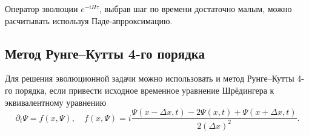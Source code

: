 \documentclass[10pt]{article}
\begin{document}
Оператор эволюции $e^{-i H \tau}$, выбрав шаг по времени достаточно малым, можно расчитывать используя Паде-апрроксимацию.

\subsection*{Метод Рунге--Кутты 4-го порядка}
Для решения эволюционной задачи можно использовать и метод Рунге--Кутты 4-го порядка, если привести исходное временное уравнение Шрёдингера к эквивалентному уравнению
\begin{equation}
 \partial_t \Psi = f(x, \Psi),\quad
 f(x, \Psi) = i\dfrac{\Psi(x-\Delta x, t) - 2 \Psi(x, t) + \Psi(x+\Delta x, t)}{2 (\Delta x)^2}.
\end{equation}
\end{document}
